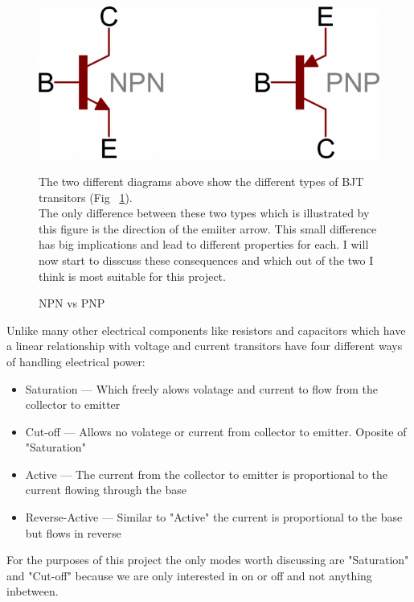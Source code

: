 \documentclass{article}
\begin{document}
\begin{figure}
    \includegraphics{pictures/npn-pnp-symbols.png}
    \caption{NPN vs PNP} \label{fig:different-transitor-layout}
    \vspace{0.5cm}

    The two different diagrams above show the different types of BJT transitors
    (Fig ~\ref{fig:different-transitor-layout}). \\

    The only difference between these two types which is illustrated by this figure is the direction of the
    emiiter arrow. This small difference has big implications and lead to different properties for each. I
    will now start to disscuss these consequences and which out of the two I think is most suitable for this
    project.

\end{figure}

\break

Unlike many other electrical components like resistors and capacitors which have a linear relationship with
voltage and current transitors have four different ways of handling electrical power:

\begin{itemize}
    \item Saturation     --- Which freely alows volatage and current to flow from the collector to emitter
    \item Cut-off        --- Allows no volatege or current from collector to emitter. Oposite of "Saturation"
    \item Active         --- The current from the collector to emitter is proportional to the current flowing
        through the base
    \item Reverse-Active --- Similar to "Active" the current is proportional to the base but flows in reverse
\end{itemize}

For the purposes of this project the only modes worth discussing are "Saturation" and "Cut-off" because we
are only interested in on or off and not anything inbetween.
\end{document}
